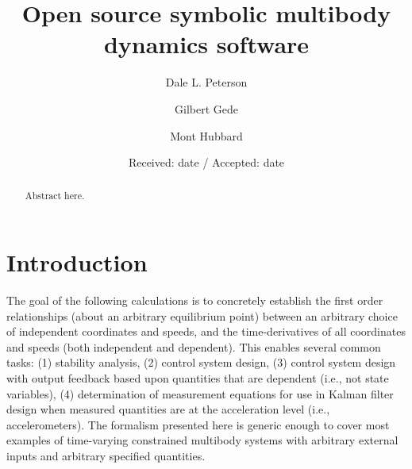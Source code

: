 \documentclass{svjour3}                     %
\begin{document}
\title{Open source symbolic multibody dynamics software}


\author{Dale L. Peterson\and Gilbert Gede\and Mont Hubbard}


\date{Received: date / Accepted: date}

\maketitle

\begin{abstract}
  Abstract here.
\end{abstract}

\section{Introduction}
\label{intro}

The goal of the following calculations is to concretely establish the first
order relationships (about an arbitrary equilibrium point) between an arbitrary
choice of independent coordinates and speeds, and the time-derivatives of all
coordinates and speeds (both independent and dependent).  This enables several
common tasks: (1) stability analysis, (2) control system design, (3) control system design with output feedback based
upon quantities that are dependent (i.e., not state variables), (4)
determination of measurement equations for use in Kalman filter design when
measured quantities are at the acceleration level (i.e., accelerometers).  The
formalism presented here is generic enough to cover most examples of
time-varying constrained multibody systems with arbitrary external inputs and
arbitrary specified quantities.
\end{document}
